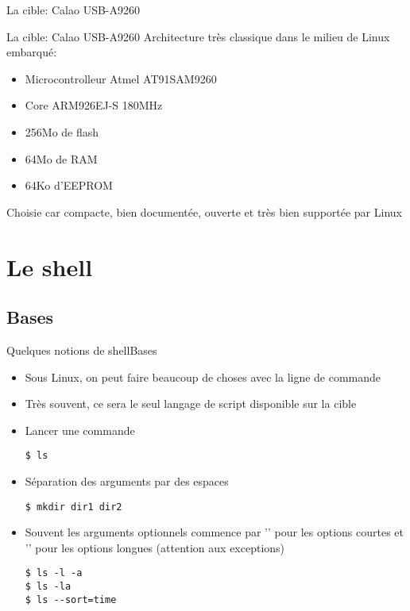 \begin{frame}{La cible: Calao USB-A9260}
  \begin{center}
    \hspace{1cm}
  \end{center}
\end{frame}

\begin{frame}{La cible: Calao USB-A9260}
  Architecture très classique dans le milieu de Linux embarqué:
  \begin{itemize}
  \item Microcontrolleur Atmel AT91SAM9260
  \item Core ARM926EJ-S 180MHz
  \item 256Mo de flash
  \item 64Mo de RAM
  \item 64Ko d'EEPROM
  \end{itemize}
  Choisie  car  compacte,  bien   documentée,  ouverte  et  très  bien
  supportée par Linux
\end{frame}

\section{Le shell}

\subsection{Bases}

\begin{frame}[fragile=singleslide]{Quelques notions de shell}{Bases}
  \begin{itemize}
  \item Sous Linux,  on peut faire beaucoup de choses  avec la ligne de
    commande
  \item Très souvent, ce sera le seul langage de script disponible sur
    la cible
  \item Lancer une commande
\begin{lstlisting}
$ ls
\end{lstlisting} %
  \item Séparation des arguments par des espaces
\begin{lstlisting}
$ mkdir dir1 dir2
\end{lstlisting} %
    \item Souvent  les arguments optionnels commence par  '\cmd{-}' pour les
      options courtes et '\cmd{--}'  pour les options longues (attention aux
      exceptions)
\begin{lstlisting}
$ ls -l -a
$ ls -la
$ ls --sort=time
\end{lstlisting} %
  \end{itemize}
\end{frame}

